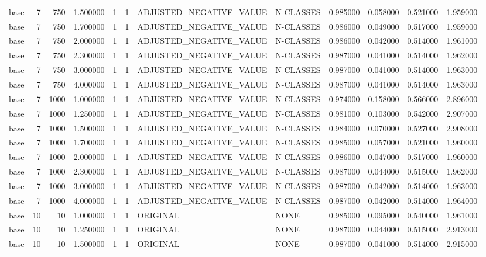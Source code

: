 \begin{tabular}{lrrrllllrrrr}
base & 7 & 750 & 1.500000 & 1 & 1 & ADJUSTED_NEGATIVE_VALUE & N-CLASSES & 0.985000 & 0.058000 & 0.521000 & 1.959000 \\
base & 7 & 750 & 1.700000 & 1 & 1 & ADJUSTED_NEGATIVE_VALUE & N-CLASSES & 0.986000 & 0.049000 & 0.517000 & 1.959000 \\
base & 7 & 750 & 2.000000 & 1 & 1 & ADJUSTED_NEGATIVE_VALUE & N-CLASSES & 0.986000 & 0.042000 & 0.514000 & 1.961000 \\
base & 7 & 750 & 2.300000 & 1 & 1 & ADJUSTED_NEGATIVE_VALUE & N-CLASSES & 0.987000 & 0.041000 & 0.514000 & 1.962000 \\
base & 7 & 750 & 3.000000 & 1 & 1 & ADJUSTED_NEGATIVE_VALUE & N-CLASSES & 0.987000 & 0.041000 & 0.514000 & 1.963000 \\
base & 7 & 750 & 4.000000 & 1 & 1 & ADJUSTED_NEGATIVE_VALUE & N-CLASSES & 0.987000 & 0.041000 & 0.514000 & 1.963000 \\
base & 7 & 1000 & 1.000000 & 1 & 1 & ADJUSTED_NEGATIVE_VALUE & N-CLASSES & 0.974000 & 0.158000 & 0.566000 & 2.896000 \\
base & 7 & 1000 & 1.250000 & 1 & 1 & ADJUSTED_NEGATIVE_VALUE & N-CLASSES & 0.981000 & 0.103000 & 0.542000 & 2.907000 \\
base & 7 & 1000 & 1.500000 & 1 & 1 & ADJUSTED_NEGATIVE_VALUE & N-CLASSES & 0.984000 & 0.070000 & 0.527000 & 2.908000 \\
base & 7 & 1000 & 1.700000 & 1 & 1 & ADJUSTED_NEGATIVE_VALUE & N-CLASSES & 0.985000 & 0.057000 & 0.521000 & 1.960000 \\
base & 7 & 1000 & 2.000000 & 1 & 1 & ADJUSTED_NEGATIVE_VALUE & N-CLASSES & 0.986000 & 0.047000 & 0.517000 & 1.960000 \\
base & 7 & 1000 & 2.300000 & 1 & 1 & ADJUSTED_NEGATIVE_VALUE & N-CLASSES & 0.987000 & 0.044000 & 0.515000 & 1.962000 \\
base & 7 & 1000 & 3.000000 & 1 & 1 & ADJUSTED_NEGATIVE_VALUE & N-CLASSES & 0.987000 & 0.042000 & 0.514000 & 1.963000 \\
base & 7 & 1000 & 4.000000 & 1 & 1 & ADJUSTED_NEGATIVE_VALUE & N-CLASSES & 0.987000 & 0.042000 & 0.514000 & 1.964000 \\
base & 10 & 10 & 1.000000 & 1 & 1 & ORIGINAL & NONE & 0.985000 & 0.095000 & 0.540000 & 1.961000 \\
base & 10 & 10 & 1.250000 & 1 & 1 & ORIGINAL & NONE & 0.987000 & 0.044000 & 0.515000 & 2.913000 \\
base & 10 & 10 & 1.500000 & 1 & 1 & ORIGINAL & NONE & 0.987000 & 0.041000 & 0.514000 & 2.915000 \\

\end{tabular}
